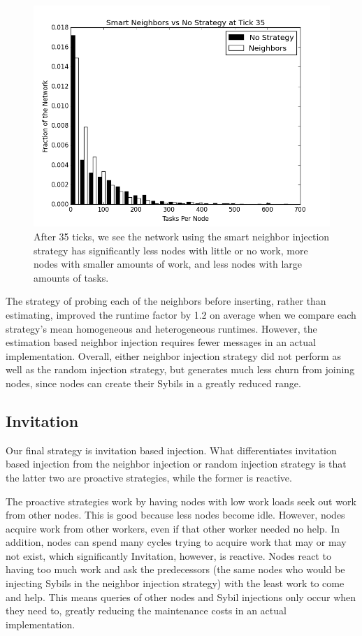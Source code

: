 \documentclass[11pt,conference]{IEEEtran}
\begin{document}
{	
	\begin{figure}
		\centering
		\includegraphics[width=0.7\linewidth]{figs/neighborsStableSmartHist35}
		\caption[Smart Neighbor injection  vs no strategy after 35 ticks.]{After 35 ticks, we see the network using the smart neighbor injection strategy has significantly less nodes with little or no work, more nodes with smaller amounts of work, and less nodes with large amounts of tasks.}
		\label{fig:neighborsStableSmartHist35}
	\end{figure}
	
	
	
	The strategy of probing each of the neighbors before inserting, rather than estimating, improved the runtime factor by 1.2  on average when we compare each strategy's mean homogeneous and heterogeneous runtimes.
	However, the estimation based neighbor injection requires fewer messages in an actual implementation.
	Overall, either neighbor injection strategy did not perform as well as the random injection strategy, but generates much less churn from joining nodes, since nodes can create their Sybils in a greatly reduced range.
	
	\subsection{Invitation}
	Our final strategy is invitation based injection.
	What differentiates invitation based injection from the neighbor injection or random injection strategy is that the latter two are proactive strategies, while the former is reactive.
	
	The proactive strategies work by having nodes with low work loads seek out work from other nodes.
	This is good because less nodes become idle.
	However, nodes acquire work from other workers, even if that other worker needed no help.
	In addition, nodes can spend many cycles trying to acquire work that may or may not exist, which significantly 
	Invitation, however, is reactive.
	Nodes react to having too much work and ask the predecessors (the same nodes who would be injecting Sybils in the neighbor injection strategy) with the least work to come and help.
	This means queries of other nodes and Sybil injections only occur when they need to, greatly reducing the maintenance costs in an actual implementation.
	
}
\end{document}
